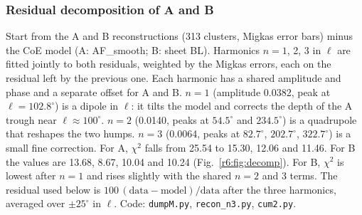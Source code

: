 \documentclass[11pt]{article}
\begin{document}
\subsubsection{Residual decomposition of A and B}
Start from the A and B reconstructions (313 clusters, Migkas error bars) minus the CoE model (A: AF\_smooth; B: sheet BL). Harmonics $n=1$, 2, 3 in $\ell$ are fitted jointly to both residuals, weighted by the Migkas errors, each on the residual left by the previous one. Each harmonic has a shared amplitude and phase and a separate offset for A and B. $n=1$ (amplitude 0.0382, peak at $\ell=102.8^\circ$) is a dipole in $\ell$: it tilts the model and corrects the depth of the A trough near $\ell\approx100^\circ$. $n=2$ (0.0140, peaks at $54.5^\circ$ and $234.5^\circ$) is a quadrupole that reshapes the two humps. $n=3$ (0.0064, peaks at $82.7^\circ$, $202.7^\circ$, $322.7^\circ$) is a small fine correction. For A, $\chi^2$ falls from 25.54 to 15.30, 12.06 and 11.46. For B the values are 13.68, 8.67, 10.04 and 10.24 (Fig.~\ref{r6:fig:decomp}). For B, $\chi^2$ is lowest after $n=1$ and rises slightly with the shared $n=2$ and 3 terms. The residual used below is $100\,(\mathrm{data}-\mathrm{model})/\mathrm{data}$ after the three harmonics, averaged over $\pm25^\circ$ in $\ell$. Code: \texttt{dumpM.py}, \texttt{recon\_n3.py}, \texttt{cum2.py}.
\end{document}
